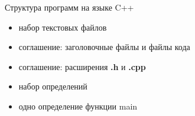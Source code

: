 \documentclass[unknownkeysallowed,xcolor=table]{beamer}
\begin{document}
\begin{frame}[fragile]{Структура программ на языке C++}
  \begin{itemize}
    \item набор текстовых файлов \vspace{1em}
    \item соглашение: заголовочные файлы и файлы кода \vspace{1em}
    \item соглашение: расширения \textbf{.h} и \textbf{.cpp} \vspace{1em}
    \item набор определений \vspace{1em}
    \item одно определение функции main
  \end{itemize}
\end{frame}
\end{document}
